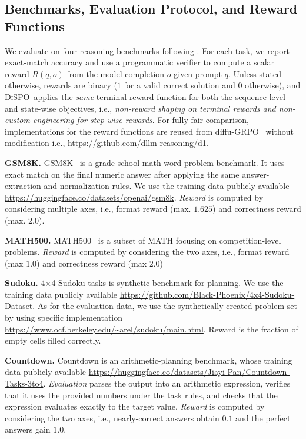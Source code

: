 \documentclass{article}
\newcommand{\method}{{\textsc{DiSPO}}}
\theoremstyle{plain}
\theoremstyle{definition}
\theoremstyle{remark}
\begin{document}
\subsection{Benchmarks, Evaluation Protocol, and Reward Functions}
\label{app:exp:benchmark}

We evaluate on four reasoning benchmarks following \citet{zhao2025d1}. 
For each task, we report exact-match accuracy and use a programmatic verifier to compute a scalar reward $R(q,o)$ from the model completion $o$ given prompt $q$. 
Unless stated otherwise, rewards are binary ($1$ for a valid correct solution and $0$ otherwise), and \method\ applies the \emph{same} terminal reward function for both the sequence-level and state-wise objectives, i.e., \emph{non-reward shaping on terminal rewards and non-custom engineering for step-wise rewards}.
For fully fair comparison, implementations for the reward functions are reused from diffu-GRPO~\citep{zhao2025d1} without modification i.e., \url{https://github.com/dllm-reasoning/d1}.

\textbf{GSM8K.}
GSM8K~\citep{gsm8k} is a grade-school math word-problem benchmark.
It uses exact match on the final numeric answer after applying the same answer-extraction and normalization rules.
We use the training data publicly available \url{https://huggingface.co/datasets/openai/gsm8k}.
\emph{Reward} is computed by considering multiple axes, i.e., format reward (max. $1.625$) and correctness reward (max. $2.0$).

\textbf{MATH500.}
MATH500~\citep{lightman2023lets} is a subset of MATH focusing on competition-level problems.
\emph{Reward} is computed by considering the two axes, i.e., format reward (max $1.0$) and correctness reward (max $2.0$)

\textbf{Sudoku.}
4$\times$4 Sudoku tasks is synthetic benchmark for planning.
We use the training data publicly available \url{https://github.com/Black-Phoenix/4x4-Sudoku-Dataset}.
As for the evaluation data, we use the synthetically created problem set by using specific implementation \url{https://www.ocf.berkeley.edu/~arel/sudoku/main.html}.
Reward is the fraction of empty cells filled correctly.

\textbf{Countdown.}
Countdown is an arithmetic-planning benchmark, whose training data publicly available \url{https://huggingface.co/datasets/Jiayi-Pan/Countdown-Tasks-3to4}.
\emph{Evaluation} parses the output into an arithmetic expression, verifies that it uses the provided numbers under the task rules, and checks that the expression evaluates exactly to the target value.
\emph{Reward} is computed by considering the two axes, i.e., nearly-correct answers obtain $0.1$ and the perfect answers gain $1.0$.
\end{document}
